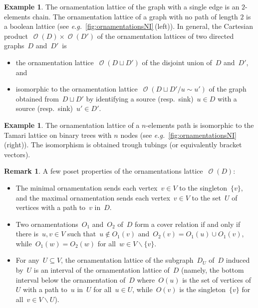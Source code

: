 \documentclass{amsart}
\theoremstyle{definition}
\newtheorem{example}[theorem]{Example}
\newtheorem{remark}[theorem]{Remark}
\renewcommand{\c}[1]{\mathcal{#1}} %
\newcommand{\ssm}{\smallsetminus} %
\newcommand{\eg}{\textit{e.g.}~} %
\DeclareMathOperator{\Orn}{\c{O}}  %
\begin{document}
\begin{example}
The ornamentation lattice of the graph with a single edge is an $2$-elements chain.
The ornamentation lattice of a graph with no path of length $2$ is a boolean lattice (see \eg \cref{fig:ornamentationsNI}\,(left)).
In general, the Cartesian product~$\Orn(D) \times \Orn(D')$ of the ornamentation lattices of two directed graphs~$D$ and~$D'$~is
\begin{itemize}
\item the ornamentation lattice~$\Orn(D \sqcup D')$ of the disjoint union of~$D$ and~$D'$, and
\item isomorphic to the ornamentation lattice~$\Orn(D \sqcup D' / u \sim u')$ of the graph obtained from~${D \sqcup D'}$ by identifying a source (resp.~sink)~$u \in D$ with a source (resp.~sink)~$u' \in D'$.
\end{itemize}
\end{example}

\begin{example}
The ornamentation lattice of a $n$-elements path is isomorphic to the Tamari lattice on binary trees with $n$ nodes (see \eg \cref{fig:ornamentationsNI}\,(right)).
The isomorphism is obtained trough tubings (or equivalently bracket vectors).
\end{example}

\begin{remark}
\label{rem:posetPropertiesOrnamentations}
A few poset properties of the ornamentations lattice~$\Orn(D)$:
\begin{itemize}
\item The minimal ornamentation sends each vertex~$v \in V$ to the singleton~$\{v\}$, and the maximal ornamentation sends each vertex~$v \in V$ to the set~$U$ of vertices with a path to~$v$ in~$D$.
\item Two ornamentations~$O_1$ and~$O_2$ of~$D$ form a cover relation if and only if there is~$u, v \in V$ such that~$u \notin O_1(v)$ and~$O_2(v) = O_1(u) \cup O_1(v)$, while~$O_1(w) = O_2(w)$ for all~$w \in V \ssm \{v\}$.
\item For any~$U \subseteq V$, the ornamentation lattice of the subgraph~$D_U$ of~$D$ induced by~$U$ is an interval of the ornamentation lattice of~$D$ (namely, the bottom interval below the ornamentation of~$D$ where~$O(u)$ is the set of vertices of~$U$ with a path to~$u$ in~$U$ for all~$u \in U$, while~$O(v)$ is the singleton~$\{v\}$ for all~$v \in V \ssm U$).
\end{itemize}
\end{remark}
\end{document}
